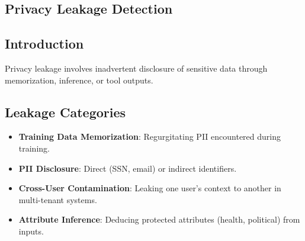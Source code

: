 \begin{TNtwocol}
\section{Privacy Leakage Detection }
\subsection{Introduction}
Privacy leakage involves inadvertent disclosure of sensitive data through memorization, inference, or tool outputs.

\subsection{Leakage Categories}
\begin{itemize}
    \item \textbf{Training Data Memorization}: Regurgitating PII encountered during training.
    \item \textbf{PII Disclosure}: Direct (SSN, email) or indirect identifiers.
    \item \textbf{Cross-User Contamination}: Leaking one user's context to another in multi-tenant systems.
    \item \textbf{Attribute Inference}: Deducing protected attributes (health, political) from inputs.
\end{itemize}

\end{TNtwocol}

